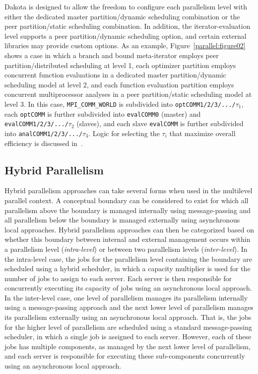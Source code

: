 Dakota is designed to allow the freedom to configure each parallelism
level with either the dedicated master partition/dynamic scheduling
combination or the peer partition/static scheduling combination. In
addition, the iterator-evaluation level supports a peer partition/dynamic 
scheduling option, and certain external libraries may provide custom options.
As an
example, Figure~\ref{parallel:figure02} shows a case in which a branch
and bound meta-iterator employs peer partition/distributed scheduling 
at level 1, each optimizer partition employs concurrent function
evaluations in a dedicated master partition/dynamic scheduling model at
level 2, and each function evaluation partition employs concurrent
multiprocessor analyses in a peer partition/static scheduling model at
level 3. In this case, \texttt{MPI\_COMM\_WORLD} is subdivided into
\texttt{optCOMM1/2/3/.../$\tau_{1}$}, each \texttt{optCOMM} is further
subdivided into \texttt{evalCOMM0} (master) and
\texttt{evalCOMM1/2/3/.../$\tau_{2}$} (slaves), and each slave
\texttt{evalCOMM} is further subdivided into
\texttt{analCOMM1/2/3/.../$\tau_{3}$}.  Logic for selecting the
$\tau_i$ that maximize overall efficiency is discussed in~\cite{Eld00}.


\subsection{Hybrid Parallelism}\label{parallel:MLP:hybrid}

Hybrid parallelism approaches can take several forms when used in the
multilevel parallel context. A conceptual boundary can be considered
to exist for which all parallelism above the boundary is managed
internally using message-passing and all parallelism below the
boundary is managed externally using asynchronous local approaches.
Hybrid parallelism approaches can then be categorized based on whether
this boundary between internal and external management occurs within a
parallelism level (\emph{intra-level}) or between two parallelism
levels (\emph{inter-level}). In the intra-level case, the jobs for the
parallelism level containing the boundary are scheduled using a hybrid
scheduler, in which a capacity multiplier is used for the number of
jobs to assign to each server. Each server is then responsible for
concurrently executing its capacity of jobs using an asynchronous
local approach. In the inter-level case, one level of parallelism
manages its parallelism internally using a message-passing approach
and the next lower level of parallelism manages its parallelism
externally using an asynchronous local approach. That is, the jobs for
the higher level of parallelism are scheduled using a standard
message-passing scheduler, in which a single job is assigned to each
server. However, each of these jobs has multiple components, as
managed by the next lower level of parallelism, and each server is
responsible for executing these sub-components concurrently using an
asynchronous local approach.

